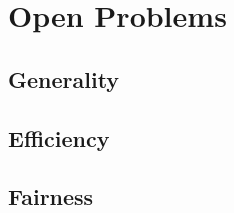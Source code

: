 \section{Open Problems} \label{sect:open-problems}


\subsection{Generality}

\subsection{Efficiency}


\subsection{Fairness}